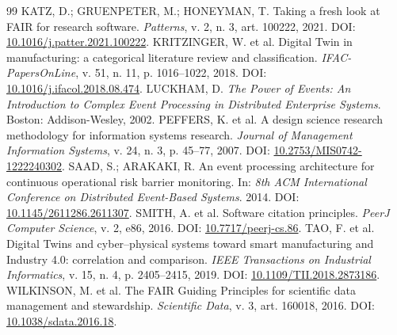 \documentclass[10pt,a4paper]{article}
\begin{document}
\begin{thebibliography}{99}
 KATZ, D.; GRUENPETER, M.; HONEYMAN, T. Taking a fresh look at FAIR for research software. \textit{Patterns}, v. 2, n. 3, art. 100222, 2021. DOI: \href{https://doi.org/10.1016/j.patter.2021.100222}{10.1016/j.patter.2021.100222}.
 KRITZINGER, W. et al. Digital Twin in manufacturing: a categorical literature review and classification. \textit{IFAC-PapersOnLine}, v. 51, n. 11, p. 1016--1022, 2018. DOI: \href{https://doi.org/10.1016/j.ifacol.2018.08.474}{10.1016/j.ifacol.2018.08.474}.
 LUCKHAM, D. \textit{The Power of Events: An Introduction to Complex Event Processing in Distributed Enterprise Systems}. Boston: Addison-Wesley, 2002.
 PEFFERS, K. et al. A design science research methodology for information systems research. \textit{Journal of Management Information Systems}, v. 24, n. 3, p. 45--77, 2007. DOI: \href{https://doi.org/10.2753/MIS0742-1222240302}{10.2753/MIS0742-1222240302}.
 SAAD, S.; ARAKAKI, R. An event processing architecture for continuous operational risk barrier monitoring. In: \textit{8th ACM International Conference on Distributed Event-Based Systems}. 2014. DOI: \href{https://doi.org/10.1145/2611286.2611307}{10.1145/2611286.2611307}.
 SMITH, A. et al. Software citation principles. \textit{PeerJ Computer Science}, v. 2, e86, 2016. DOI: \href{https://doi.org/10.7717/peerj-cs.86}{10.7717/peerj-cs.86}.
 TAO, F. et al. Digital Twins and cyber--physical systems toward smart manufacturing and Industry 4.0: correlation and comparison. \textit{IEEE Transactions on Industrial Informatics}, v. 15, n. 4, p. 2405--2415, 2019. DOI: \href{https://doi.org/10.1109/TII.2018.2873186}{10.1109/TII.2018.2873186}.
 WILKINSON, M. et al. The FAIR Guiding Principles for scientific data management and stewardship. \textit{Scientific Data}, v. 3, art. 160018, 2016. DOI: \href{https://doi.org/10.1038/sdata.2016.18}{10.1038/sdata.2016.18}.
\end{thebibliography}
\end{document}
